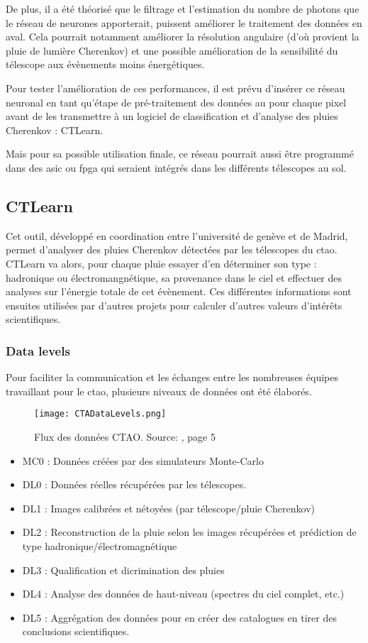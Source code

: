 De plus, il a été théorisé que le filtrage et l'estimation du nombre de photons que le réseau de neurones apporterait, puissent améliorer 
le traitement des données en aval. Cela pourrait notamment améliorer la résolution angulaire (d'où provient la pluie de lumière Cherenkov) et une possible amélioration de
la sensibilité du télescope aux évènements moins énergétiques.

Pour tester l'amélioration de ces performances, il est prévu d'insérer ce réseau neuronal en tant qu'étape de pré-traitement des données
au pour chaque pixel avant de les transmettre à un logiciel de classification et d'analyse des pluies Cherenkov : CTLearn.

Mais pour sa possible utilisation finale, ce réseau pourrait aussi être programmé dans des \gls{asic} ou \gls{fpga} qui seraient intégrés dans les différents télescopes au sol.

\subsection{CTLearn}
Cet outil, développé en coordination entre l'université de genève et de Madrid, permet d'analyser des pluies Cherenkov détectées 
par les télescopes du \gls{ctao}. CTLearn va alors, pour chaque pluie essayer d'en déterminer son type : hadronique ou électromangnétique, 
sa provenance dans le ciel et effectuer des analyses sur l'énergie totale de cet évènement.
Ces différentes informations sont ensuites utilisées par d'autres projets pour calculer d'autres valeurs d'intérêts scientifiques.

\subsubsection{Data levels}
Pour faciliter la communication et les échanges entre les nombreuses équipes travaillant pour le \gls{ctao}, 
plusieurs niveaux de données ont été élaborés.

\begin{figure}[tbph!]
	\centering
	\texttt{[image: CTADataLevels.png]}
	\caption[Flux des données CTAO]{Flux des données CTAO. Source: \cite{CTAOComputingChallenges}, page 5}
\end{figure}

\begin{itemize}
	\item MC0 : Données créées par des simulateurs Monte-Carlo
	\item DL0 : Données réelles récupérées par les télescopes.
	\item DL1 : Images calibrées et nétoyées (par télescope/pluie Cherenkov)
	\item DL2 : Reconstruction de la pluie selon les images récupérées et prédiction de type hadronique/électromagnétique
	\item DL3 : Qualification et dicrimination des pluies
	\item DL4 : Analyse des données de haut-niveau (spectres du ciel complet, etc.)
	\item DL5 : Aggrégation des données pour en créer des catalogues en tirer des conclusions scientifiques.
\end{itemize}

